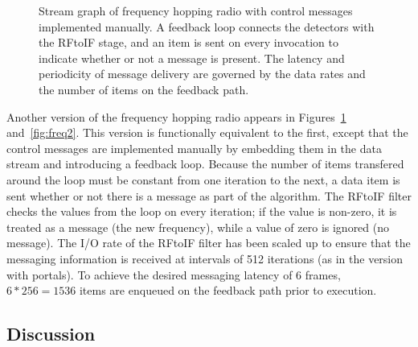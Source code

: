 \begin{figure}[t]
\centering
{}
\caption[Stream graph of frequency hopping radio with manual control
  messages]{Stream graph of frequency hopping radio with control
  messages implemented manually.  A feedback loop connects the
  detectors with the RFtoIF stage, and an item is sent on every
  invocation to indicate whether or not a message is present.  The
  latency and periodicity of message delivery are governed by the data
  rates and the number of items on the feedback
  path. \protect\label{fig:fhr-manual}}
\end{figure}

Another version of the frequency hopping radio appears in
Figures~\ref{fig:fhr-manual} and~\ref{fig:freq2}.  This version is
functionally equivalent to the first, except that the control messages
are implemented manually by embedding them in the data stream and
introducing a feedback loop.  Because the number of items transfered
around the loop must be constant from one iteration to the next, a
data item is sent whether or not there is a message as part of the
algorithm.  The RFtoIF filter checks the values from the loop on every
iteration; if the value is non-zero, it is treated as a message (the
new frequency), while a value of zero is ignored (no message).  The
I/O rate of the RFtoIF filter has been scaled up to ensure that the
messaging information is received at intervals of 512 iterations (as
in the version with portals).  To achieve the desired messaging
latency of 6 frames, $6*256 = 1536$ items are enqueued on the feedback
path prior to execution.


\subsection*{Discussion}


